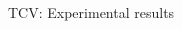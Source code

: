 \documentclass{beamer}
\begin{document}
\begin{frame}{TCV: Experimental results}
    \begin{columns}
    	\begin{column}{0.4\textwidth}
    	     \scriptsize
    	     \begin{left}

        	     \begin{itemize}
        	     \end{itemize}


\end{left}
\end{column}
\end{columns}
\end{frame}
\end{document}
